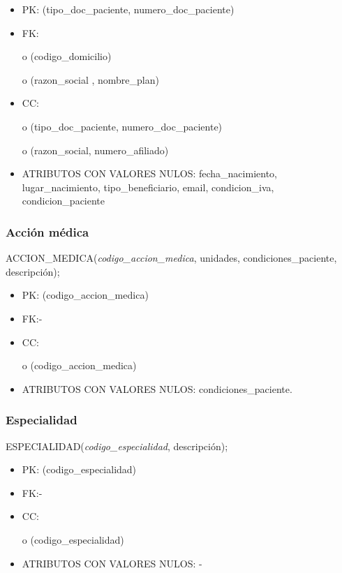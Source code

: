 \documentclass[a4paper,11pt]{article}
\begin{document}
\begin{itemize}
\item PK: (tipo\_doc\_paciente, numero\_doc\_paciente)

\item FK: 

o (codigo\_domicilio) 

o (razon\_social , nombre\_plan)

\item CC:

o (tipo\_doc\_paciente, numero\_doc\_paciente)

o (razon\_social, numero\_afiliado)

\item ATRIBUTOS CON VALORES NULOS:  fecha\_nacimiento, lugar\_nacimiento, tipo\_beneficiario, 
email, condicion\_iva, condicion\_paciente\label{HToc293405836}
\end{itemize}

\subsubsection{\textbf{Acción médica}}

ACCION\_MEDICA(\emph{codigo\_accion\_medica}, unidades, condiciones\_paciente, 
descripción);

\begin{itemize}
\item PK: (codigo\_accion\_medica)

\item FK:-

\item CC:

o (codigo\_accion\_medica)

\item ATRIBUTOS CON VALORES NULOS:  condiciones\_paciente.\label{HToc293405837}
\end{itemize}

\subsubsection{\textbf{Especialidad}}

ESPECIALIDAD(\emph{codigo\_especialidad}, descripción);

\begin{itemize}
\item PK: (codigo\_especialidad)

\item FK:-

\item CC:

o (codigo\_especialidad)

\item ATRIBUTOS CON VALORES NULOS: - \label{HToc293405838}
\end{itemize}
\end{document}
